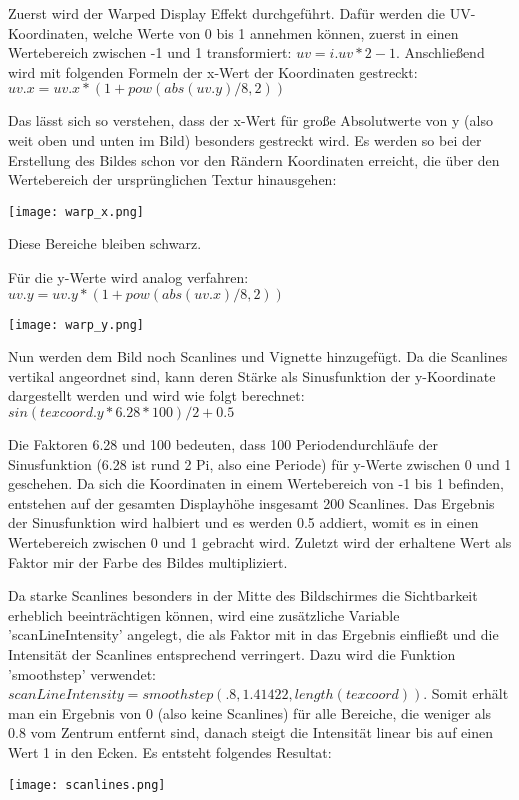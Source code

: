 Zuerst wird der Warped Display Effekt durchgeführt. Dafür werden die UV-Koordinaten, welche Werte von 0 bis 1 annehmen können, zuerst in einen Wertebereich zwischen -1 und 1 transformiert: $uv = i.uv * 2 - 1$.
Anschlie{\ss}end wird mit folgenden Formeln der x-Wert der Koordinaten gestreckt: $uv.x = uv.x * (1 + pow(abs(uv.y) / 8, 2))$

Das lässt sich so verstehen, dass der x-Wert für gro{\ss}e Absolutwerte von y (also weit oben und unten im Bild) besonders gestreckt wird. Es werden so bei der Erstellung des Bildes schon vor den Rändern Koordinaten erreicht, die über den Wertebereich der ursprünglichen Textur hinausgehen:

\texttt{[image: warp\_x.png]}

Diese Bereiche bleiben schwarz.

Für die y-Werte wird analog verfahren: $uv.y = uv.y * (1 + pow(abs(uv.x) / 8, 2))$

\texttt{[image: warp\_y.png]}

Nun werden dem Bild noch Scanlines und Vignette hinzugefügt. Da die Scanlines vertikal angeordnet sind, kann deren Stärke als Sinusfunktion der y-Koordinate dargestellt werden und wird wie folgt berechnet: $sin(texcoord.y * 6.28 * 100) / 2 + 0.5$ 

Die Faktoren 6.28 und 100 bedeuten, dass 100 Periodendurchläufe der Sinusfunktion (6.28 ist rund 2 Pi, also eine Periode) für y-Werte zwischen 0 und 1 geschehen. Da sich die Koordinaten in einem Wertebereich von -1 bis 1 befinden, entstehen auf der gesamten Displayhöhe insgesamt 200 Scanlines. Das Ergebnis der Sinusfunktion wird halbiert und es werden 0.5 addiert, womit es in einen Wertebereich zwischen 0 und 1 gebracht wird. Zuletzt wird der erhaltene Wert als Faktor mir der Farbe des Bildes multipliziert. 

Da starke Scanlines besonders in der Mitte des Bildschirmes die Sichtbarkeit erheblich beeinträchtigen können, wird eine zusätzliche Variable 'scanLineIntensity' angelegt, die als Faktor mit in das Ergebnis einflie{\ss}t und die Intensität der Scanlines entsprechend verringert. Dazu wird die Funktion 'smoothstep' verwendet: $scanLineIntensity = smoothstep(.8, 1.41422, length(texcoord))$. Somit erhält man ein Ergebnis von 0 (also keine Scanlines) für alle Bereiche, die weniger als 0.8 vom Zentrum entfernt sind, danach steigt die Intensität linear bis auf einen Wert 1 in den Ecken. Es entsteht folgendes Resultat:

\texttt{[image: scanlines.png]}

